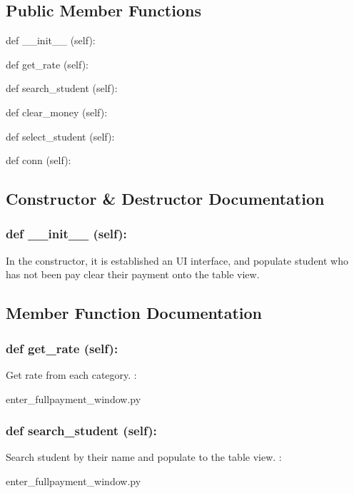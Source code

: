 \subsection*{Public Member Functions}
\begin{DoxyCompactItemize}
\item 
def {\_\_init\_\_} (self):
\item 
def {get\_rate} (self):
\item 
def {search\_student} (self):
\item 
def {clear\_money} (self):
\item 
def {select\_student} (self):
\item 
def {conn} (self):
\end{DoxyCompactItemize}

\subsection{Constructor \& Destructor Documentation}
\hypertarget{class_poly_aa3def076b74bed67904976ad4f9fe9b1}{
\subsubsection[{def __init__ (self):}]{\setlength{\rightskip}{0pt plus 5cm}def {\_\_init\_\_} (self): 
}}
In the constructor, it is established an UI interface, and populate student who has not been pay clear their payment onto the table view. 

\subsection{Member Function Documentation}
\hypertarget{class_poly_a14a7ad77ce612b0c54f531d307ee4b39}{
\subsubsection[{def get_rate (self):}]{\setlength{\rightskip}{0pt plus 5cm}def {get\_rate} (self):}}\label{class_poly_a14a7ad77ce612b0c54f531d307ee4b39}
Get rate from each category.
:\begin{DoxyCompactItemize}
\item 
enter\_fullpayment\_window.\-py\end{DoxyCompactItemize}

\hypertarget{class_poly_a14a7ad77ce612b0c54f531d307ee4b39}{
\subsubsection[{def search_student (self):}]{\setlength{\rightskip}{0pt plus 5cm}def {search\_student} (self):}}\label{class_poly_a14a7ad77ce612b0c54f531d307ee4b39}
Search student by their name and populate to the table view.
:\begin{DoxyCompactItemize}
\item 
enter\_fullpayment\_window.\-py\end{DoxyCompactItemize}

